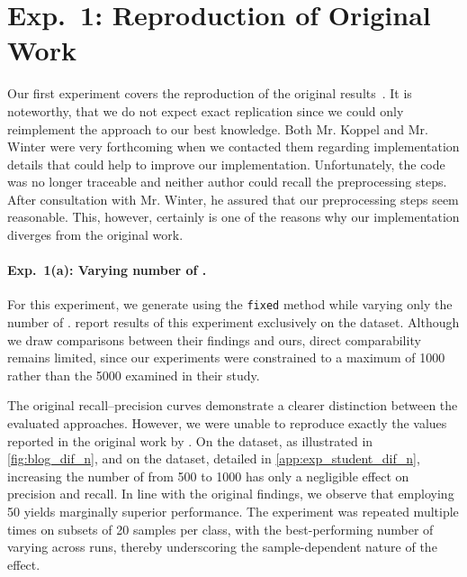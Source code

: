 
\section{Exp.\ 1: Reproduction of Original Work}

Our first experiment covers the reproduction of the original results~\citep{koppel_determining_2014}.
It is noteworthy, that we do not expect exact replication since we could only reimplement the approach to our best knowledge.
Both Mr. Koppel and Mr. Winter were very forthcoming when we contacted them regarding implementation details that could help to improve our implementation.
Unfortunately, the code was no longer traceable and neither author could recall the preprocessing steps.
After consultation with Mr. Winter, he assured that our preprocessing steps seem reasonable.
This, however, certainly is one of the reasons why our implementation diverges from the original work.

\paragraph{Exp.\ 1(a): Varying number of \imps{}.}

For this experiment, we generate \imps{} using the \texttt{fixed} method while varying only the number of \imps{}.
\citet{koppel_determining_2014} report results of this experiment exclusively on the \dataBlog{} dataset.
Although we draw comparisons between their findings and ours, direct comparability remains limited, since our experiments were constrained to a maximum of \num{1000} \imps{} rather than the \num{5000} examined in their study.

The original \impAppr{} recall–precision curves demonstrate a clearer distinction between the evaluated approaches.
However, we were unable to reproduce exactly the values reported in the original work by \citet{koppel_determining_2014}.
On the \dataBlog{} dataset, as illustrated in \autoref{fig:blog_dif_n}, and on the \dataStudent{} dataset, detailed in \autoref{app:exp_student_dif_n}, increasing the number of \imps{} from 500 to \num{1000} has only a negligible effect on precision and recall.
In line with the original findings, we observe that employing 50 \imps{} yields marginally superior performance.
The experiment was repeated multiple times on subsets of 20 samples per class, with the best-performing number of \imps{} varying across runs, thereby underscoring the sample-dependent nature of the effect.




